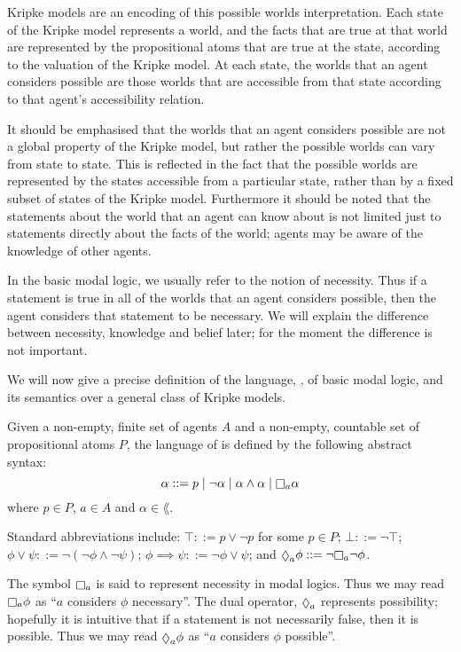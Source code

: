 Kripke models are an encoding of this possible worlds interpretation. Each state
of the Kripke model represents a world, and the facts that are true at that
world are represented by the propositional atoms that are true at the state,
according to the valuation of the Kripke model. At each state, the worlds that
an agent considers possible are those worlds that are accessible from that state
according to that agent's accessibility relation.

It should be emphasised that the worlds that an agent considers possible are not
a global property of the Kripke model, but rather the possible worlds can vary
from state to state. This is reflected in the fact that the possible worlds are
represented by the states accessible from a particular state, rather than by a
fixed subset of states of the Kripke model. Furthermore it should be noted that
the statements about the world that an agent can know about is not limited just
to statements directly about the facts of the world; agents may be aware of the
knowledge of other agents.

In the basic modal logic, we usually refer to the notion of necessity. Thus if a
statement is true in all of the worlds that an agent considers possible, then
the agent considers that statement to be necessary. We will explain the
difference between necessity, knowledge and belief later; for the moment the
difference is not important.

We will now give a precise definition of the language, \lang{}, of basic modal
logic, and its semantics over a general class of Kripke models.

\begin{definition}
Given a non-empty, finite set of agents $A$ and a non-empty, countable set of
propositional atoms $P$, the language of \lang{} is defined by the following
abstract syntax:
$$
\alpha ::=  p \bnfalt
            \neg \alpha \bnfalt
            \alpha \land \alpha \bnfalt
            \knows_a \alpha
$$
where $p \in P$, $a \in A$ and $\alpha \in \lang{}$.
\end{definition}

Standard abbreviations include:
$\top ::= p \lor \neg p$ for some $p \in P$;
$\bot ::= \neg \top$;
$\phi \lor \psi ::= \neg (\neg \phi \land \neg \psi)$;
$\phi \implies \psi ::= \neg \phi \lor \psi$;
and $\suspects_a \phi ::= \neg \knows_a \neg \phi$.

The symbol $\knows_a$ is said to represent necessity in modal logics. Thus we
may read $\knows_a \phi$ as ``$a$ considers $\phi$ necessary''. The dual
operator, $\suspects_a$ represents possibility; hopefully it is intuitive that
if a statement is not necessarily false, then it is possible. Thus we may read
$\suspects_a \phi$ as ``$a$ considers $\phi$ possible''.

